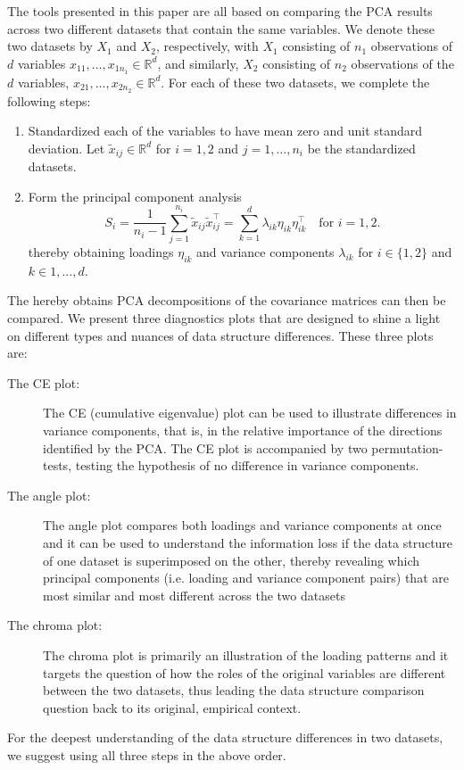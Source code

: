\documentclass[titlepage,11pt,twoside]{article}
\newcommand{\RR}{\mathbb{R}}
\begin{document}
The tools presented in this paper are all based on comparing the PCA results across two different datasets that contain the same variables. We denote these two datasets by $X_1$ and $X_2$, respectively, with $X_1$ consisting of $n_1$ observations of $d$ variables $x_{11},\dotsc,x_{1 n_1} \in \RR^d$, and similarly, $X_2$ consisting of $n_2$ observations of the $d$ variables, $x_{21},\dotsc,x_{2 n_2} \in \RR^d$. For each of these two datasets, we complete the following steps:
\begin{enumerate}
\item Standardized each of the variables to have mean zero and unit standard deviation. Let $\tilde{x}_{ij} \in \RR^d$ for $i=1,2$ and $j=1,\dotsc,n_i$ be the standardized datasets.
\item Form the principal component analysis
\begin{equation*}
S_i = \frac{1}{n_i-1} \sum_{j=1}^{n_i} \tilde{x}_{ij} \tilde{x}_{ij}^\top = \sum_{k=1}^d \lambda_{ik} \eta_{ik} \eta_{ik}^\top \quad \text{for $i=1,2$.}
\end{equation*}
thereby obtaining loadings $\eta_{ik}$ and variance components $\lambda_{ik}$ for $i \in \{1, 2\}$ and $k \in 1, ..., d$.
\end{enumerate}
The hereby obtains PCA decompositions of the covariance matrices can then be compared. We present three diagnostics plots that are designed to shine a light on different types and nuances of data structure differences. These three plots are:
\begin{description}
\item[The CE plot:] The CE (cumulative eigenvalue) plot can be used to illustrate differences in variance components, that is, in the relative importance of the directions identified by the PCA. The CE plot is accompanied by two permutation-tests, testing the hypothesis of no difference in variance components.
\item[The angle plot:] The angle plot compares both loadings and variance components at once and it can be used to understand the information loss if the data structure of one dataset is superimposed on the other, thereby revealing which principal components (i.e. loading and variance component pairs) that are most similar and most different across the two datasets
\item[The chroma plot:] The chroma plot is primarily an illustration of the loading patterns and it targets the question of how the roles of the original variables are different between the two datasets, thus leading the data structure comparison question back to its original, empirical context.
\end{description}
For the deepest understanding of the data structure differences in two datasets, we suggest using all three steps in the above order.
\end{document}
